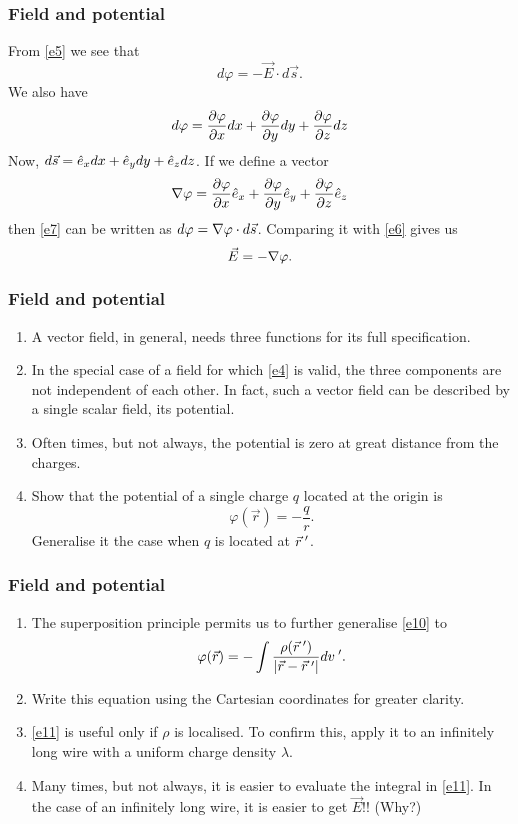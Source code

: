 \documentclass{beamer}
\begin{document}
\begin{frame}
\frametitle{Field and potential}
From \eqref{e5} we see that
\begin{equation}\label{e6}
d\varphi = -\vec{E}\cdot d\vec{s}.
\end{equation}
We also have
\begin{equation}\label{e7}
d\varphi = \frac{\partial{\varphi}}{\partial{x}}dx + \frac{\partial{\varphi}}{\partial{y}}dy + \frac{\partial{\varphi}}{\partial{z}}dz
\end{equation}
Now, $d\vec{s} = \hat{e}_{x}dx + \hat{e}_{y}dy + \hat{e}_{z}dz$. If we define a vector
\begin{equation}\label{e8}
\nabla\varphi = \frac{\partial{\varphi}}{\partial{x}}\hat{e}_{x} + \frac{\partial{\varphi}}{\partial{y}}\hat{e}_{y} + \frac{\partial{\varphi}}{\partial{z}}\hat{e}_{z}
\end{equation}
then \eqref{e7} can be written as $d\varphi = \nabla\varphi\cdot d\vec{s}$. Comparing
it with \eqref{e6} gives us
\begin{equation}\label{e9}
\vec{E} = -\nabla\varphi.
\end{equation}
\end{frame}

\begin{frame}
\frametitle{Field and potential}
\begin{enumerate}
\item A vector field, in general, needs three functions for its full specification.
\item In the special case of a field for which \eqref{e4} is valid, the three components
are not independent of each other. In fact, such a vector field can be described
by a single scalar field, its potential.
\item Often times, but not always, the potential is zero at great distance from the
charges.
\item Show that the potential of a single charge $q$ located at the origin is
\begin{equation}\label{e10}
\varphi(\vec{r}) = -\frac{q}{r}.
\end{equation}
Generalise it the case when $q$ is located at $\vec{r}^{\;\prime}$.
\end{enumerate}
\end{frame}

\begin{frame}
\frametitle{Field and potential}
\begin{enumerate}
\item The superposition principle permits us to further generalise \eqref{e10} to
\begin{equation}\label{e11}
\varphi(\vec{r}) = -\int\frac{\rho(\vec{r}^{\;\prime})}{|\vec{r} - \vec{r}^{\;\prime}|}dv^{\;\prime}.
\end{equation}
\item Write this equation using the Cartesian coordinates for greater clarity.
\item \eqref{e11} is useful only if $\rho$ is localised. To confirm this, apply it
to an infinitely long wire with a uniform charge density $\lambda$.
\item Many times, but not always, it is easier to evaluate the integral in \eqref{e11}.
In the case of an infinitely long wire, it is easier to get $\vec{E}$!! (Why?)

\end{enumerate}
\end{frame}
\end{document}
